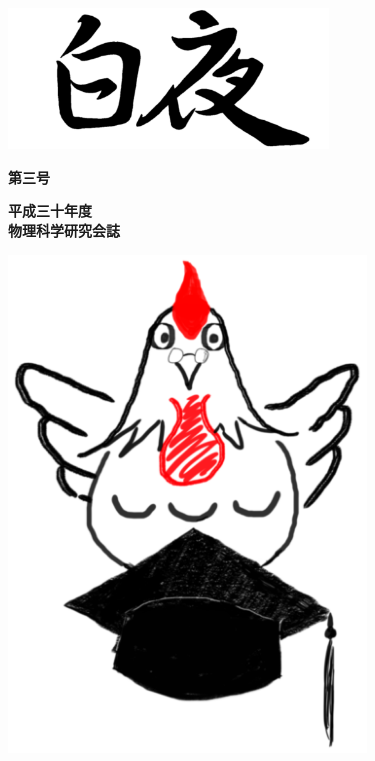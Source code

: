 \documentclass[11pt,b5paper,papersize,dvipdfmx]{jsbook}
\begin{document}
%
\begin{minipage}{0.07\hsize}
  \quad
\end{minipage}
%
\begin{minipage}{0.88\hsize}
  \thispagestyle{empty}
  \begin{center}
    \vspace{-4zw}
    \includegraphics[width=8.5cm]{01img02.png}
  \end{center}
  \begin{flushright}
    \vspace{-7zw}
    {\fontsize{18}{0}\selectfont \bf 第三号 　}
  \end{flushright}
  \vspace{2zw}
  \begin{center}
    \vspace{-0.3zw}
    {\fontsize{13}{0}\selectfont \bf 平成三十年度}\\
    \vspace{0.2zw}
    {\fontsize{13}{0}\selectfont \bf 物理科学研究会誌}\\
  \end{center}
  \begin{center}
    \vspace{1zw}
    \includegraphics[width=9.5cm]{01img01.png}\\

\end{center}
\end{minipage}
\end{document}
